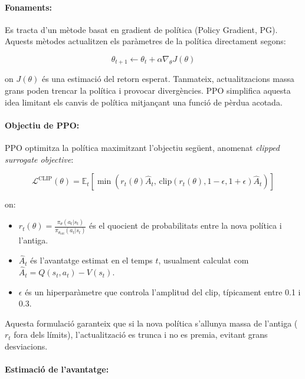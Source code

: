 \documentclass[12pt,a4paper,twoside]{book}
\begin{document}
\paragraph{Fonaments:}

Es tracta d'un mètode basat en gradient de política (Policy Gradient, PG). Aquests mètodes actualitzen els paràmetres de la política directament segons:

\begin{equation}
\theta_{t+1} \leftarrow \theta_t + \alpha \nabla_\theta J(\theta)
\end{equation}

on $J(\theta)$ és una estimació del retorn esperat. Tanmateix, actualitzacions massa grans poden trencar la política i provocar divergències. PPO simplifica aquesta idea limitant els canvis de política mitjançant una funció de pèrdua acotada.

\paragraph{Objectiu de PPO:}

PPO optimitza la política maximitzant l'objectiu següent, anomenat \textit{clipped surrogate objective}:

\begin{equation}
\mathcal{L}^{\text{CLIP}}(\theta) = \mathbb{E}_t \left[ \min \left( r_t(\theta) \hat{A}_t, \, \text{clip}(r_t(\theta), 1 - \epsilon, 1 + \epsilon) \hat{A}_t \right) \right]
\end{equation}

on:
\begin{itemize}
  \item $r_t(\theta) = \frac{\pi_\theta(a_t | s_t)}{\pi_{\theta_{\text{old}}}(a_t | s_t)}$ és el quocient de probabilitats entre la nova política i l'antiga.
  \item $\hat{A}_t$ és l'avantatge estimat en el temps $t$, usualment calculat com $\hat{A}_t = Q(s_t,a_t) - V(s_t)$.
  \item $\epsilon$ és un hiperparàmetre que controla l'amplitud del clip, típicament entre 0.1 i 0.3.
\end{itemize}

Aquesta formulació garanteix que si la nova política s'allunya massa de l'antiga ($r_t$ fora dels límits), l'actualització es trunca i no es premia, evitant grans desviacions.

\paragraph{Estimació de l'avantatge:}
\end{document}
